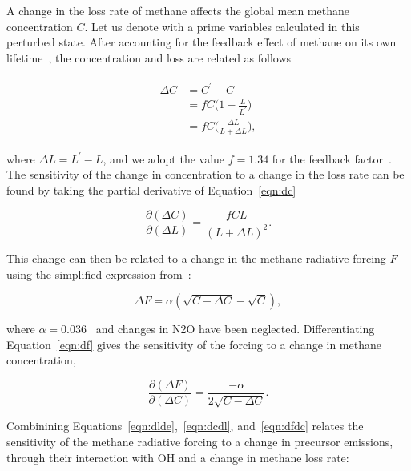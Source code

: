A change in the loss rate of methane affects the global mean methane concentration $C$. Let us denote with a prime variables calculated in this perturbed state. After accounting for the feedback effect of methane on its own lifetime~\citep{ref:fuglestvedt1999,ref:naik2005}, the concentration and loss are related as follows

\begin{equation}
\begin{align}
\begin{split}
\Delta C &= C^{\prime} - C \\
         &= f C \Big(1 - \frac{L}{L^{\prime}}\Big) \\
         &= fC\Big(\frac{\Delta L}{L+\Delta L}\Big),
\end{split}
\label{eqn:dc}
\end{align}
\end{equation}

where $\Delta L = L^{\prime}-L$, and we adopt the value $f=1.34$ for the feedback factor~\citep{ref:holmes2013}. The sensitivity of the change in concentration to a change in the loss rate can be found by taking the partial derivative of Equation~\ref{eqn:dc}

\begin{equation}
\frac{\partial (\Delta C)}{\partial (\Delta L)} = \frac{fCL}{(L+\Delta L)^2}.
\label{eqn:dcdl}
\end{equation}

This change can then be related to a change in the methane radiative forcing $F$ using the simplified expression from~\citet{ref:myhre1998}:

\begin{equation}
\Delta F = \alpha (\sqrt{C-\Delta C} - \sqrt{C}),
\label{eqn:df}
\end{equation}

where $\alpha=0.036$~\citep{ref:myhre1998} and changes in N2O have been neglected. Differentiating Equation~\ref{eqn:df} gives the sensitivity of the forcing to a change in methane concentration,

\begin{equation}
\frac{\partial (\Delta F)}{\partial (\Delta C)} = \frac{-\alpha}{2\sqrt{C-\Delta C}}.
\label{eqn:dfdc}
\end{equation}

Combinining Equations~\ref{eqn:dlde},~\ref{eqn:dcdl}, and~\ref{eqn:dfdc} relates the sensitivity of the methane radiative forcing to a change in precursor emissions, through their interaction with OH and a change in methane loss rate:

